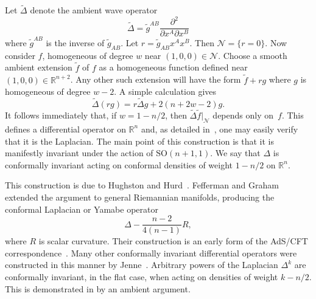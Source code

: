 \documentclass[a4paper,12pt]{amsart}
\begin{document}
Let $\widetilde\Delta$ denote the ambient wave operator
$$\widetilde\Delta=
\widetilde g^{AB}\frac{\partial^2}{\partial x^A\partial x^B}$$
where $\widetilde g^{AB}$ is the inverse of $\widetilde g_{AB}$. Let
$r=\widetilde g_{AB}x^Ax^B$. Then \mbox{${\mathcal N}=\{r=0\}$}. Now consider
$f$, homogeneous of degree $w$ near $(1,0,0)\in{\mathcal N}$. Choose a smooth
ambient extension $\widetilde f$ of $f$ as a homogeneous function defined near
$(1,0,0)\in{\mathbb R}^{n+2}$. Any other such extension will have the form
$\widetilde f+rg$ where $g$ is homogeneous of degree $w-2$. A simple
calculation gives
$$\widetilde\Delta(rg)=r\widetilde\Delta g+2(n+2w-2)g.$$
It follows immediately that, if $w=1-n/2$, then
$\widetilde\Delta\widetilde f|_{\mathcal N}$ depends only on~$f$. This defines
a differential operator on ${\mathbb R}^n$ and, as detailed in~\cite{eg}, one
may easily verify that it is the Laplacian. The main point of this construction
is that it is manifestly invariant under the action of ${\mathrm{SO}}(n+1,1)$.
We say that $\Delta$ is conformally invariant acting on conformal densities of
weight $1-n/2$ on ${\mathbb R}^n$.

This construction is due to Hughston and Hurd~\cite{hh}. Fefferman and
Graham~\cite{fg} extended the argument to general Riemannian manifolds,
producing the conformal Laplacian or Yamabe operator
\begin{equation}\label{yamabe}\Delta-\frac{n-2}{4(n-1)}R,\end{equation}
where $R$ is scalar curvature. Their construction is an early form of the
AdS/CFT correspondence~\cite{ma,wi}. Many other conformally invariant
differential operators were constructed in this manner by Jenne~\cite{j}.
Arbitrary powers of the Laplacian $\Delta^k$ are conformally invariant, in the
flat case, when acting on densities of weight $k-n/2$. This is demonstrated in
\cite[Proposition~4.4]{eg} by an ambient argument.
\end{document}

